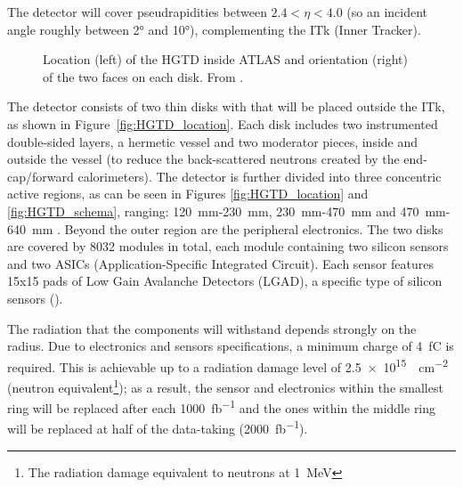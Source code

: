 The detector will cover pseudrapidities between \(2.4 < \eta < 4.0\) (so an incident angle roughly between 2° and 10°), complementing the ITk (Inner Tracker).
\begin{figure}[h!tbpt]
    \centering
    \hfill
    \centering
    \captionsetup{width=\captionwidth}
    \caption{Location (left) of the HGTD inside ATLAS and orientation (right) of the two faces on each disk. From \cite{cernTechnicalDesign}.}
\end{figure}

The detector consists of two thin disks with that will be placed outside the ITk, as shown in Figure~\ref{fig:HGTD_location}. Each disk includes two instrumented double-sided layers, a hermetic vessel and two moderator pieces, inside and outside the vessel (to reduce the back-scattered neutrons created by the end-cap/forward calorimeters). The detector is further divided into three concentric active regions, as can be seen in Figures \ref{fig:HGTD_location} and \ref{fig:HGTD_schema}, ranging: \qty{120}{\milli\meter}-\qty{230}{\milli\meter}, \qty{230}{\milli\meter}-\qty{470}{\milli\meter} and \qty{470}{\milli\meter}-\qty{640}{\milli\meter} \cite{CERN-LHCC-2020-007}. Beyond the outer region are the peripheral electronics.
The two disks are covered by 8032 modules in total, each module containing two silicon sensors and two ASICs (Application-Specific Integrated Circuit). Each sensor features 15x15 pads of Low Gain Avalanche Detectors (LGAD), a specific type of silicon sensors ().

The radiation that the components will withstand depends strongly on the radius. Due to electronics and sensors specifications, a minimum charge of \qty{4}{\femto\coulomb} is required. This is achievable up to a radiation damage level of \qty{2.5e15}{\neutroneq\centi\meter^{-2}} (neutron equivalent\footnote{The radiation damage equivalent to neutrons at \qty{1}{\mega\electronvolt}}); as a result, the sensor and electronics within the smallest ring will be replaced after each \qty{1000}{\femto\barn^{-1}} and the ones within the middle ring will be replaced at half of the data-taking (\qty{2000}{\femto\barn^{-1}}).


